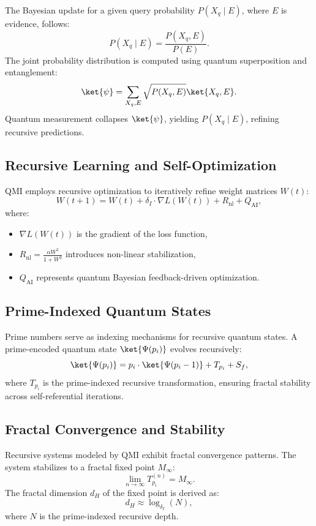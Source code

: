 \documentclass{article}
\theoremstyle{plain}
\begin{document}
The Bayesian update for a given query probability $P(X_q \mid E)$, where $E$ is evidence, follows:
\begin{equation}
    P(X_q \mid E) = \frac{P(X_q, E)}{P(E)}.
\end{equation}
The joint probability distribution is computed using quantum superposition and entanglement:
\begin{equation}
    \ket{\psi} = \sum_{X_q, E} \sqrt{P(X_q, E)} \ket{X_q, E}.
\end{equation}
Quantum measurement collapses $\ket{\psi}$, yielding $P(X_q \mid E)$, refining recursive predictions.

\subsection{Recursive Learning and Self-Optimization}
QMI employs recursive optimization to iteratively refine weight matrices $W(t)$:
\begin{equation}
    W(t+1) = W(t) + \delta_I \cdot \nabla L(W(t)) + R_{\text{nl}} + Q_{\text{AI}},
\end{equation}
where:
\begin{itemize}
    \item $\nabla L(W(t))$ is the gradient of the loss function,
    \item $R_{\text{nl}} = \frac{\alpha W^2}{1 + W^2}$ introduces non-linear stabilization,
    \item $Q_{\text{AI}}$ represents quantum Bayesian feedback-driven optimization.
\end{itemize}

\subsection{Prime-Indexed Quantum States}
Prime numbers serve as indexing mechanisms for recursive quantum states. A prime-encoded quantum state $\ket{\Psi(p_i)}$ evolves recursively:
\begin{equation}
    \ket{\Psi(p_i)} = p_i \cdot \ket{\Psi(p_i - 1)} + T_{p_i} + S_f,
\end{equation}
where $T_{p_i}$ is the prime-indexed recursive transformation, ensuring fractal stability across self-referential iterations.

\subsection{Fractal Convergence and Stability}
Recursive systems modeled by QMI exhibit fractal convergence patterns. The system stabilizes to a fractal fixed point $M_\infty$:
\begin{equation}
    \lim_{n \to \infty} T_{p_i}^{(n)} = M_\infty.
\end{equation}
The fractal dimension $d_H$ of the fixed point is derived as:
\begin{equation}
    d_H \approx \log_{\delta_I} (N),
\end{equation}
where $N$ is the prime-indexed recursive depth.
\end{document}
